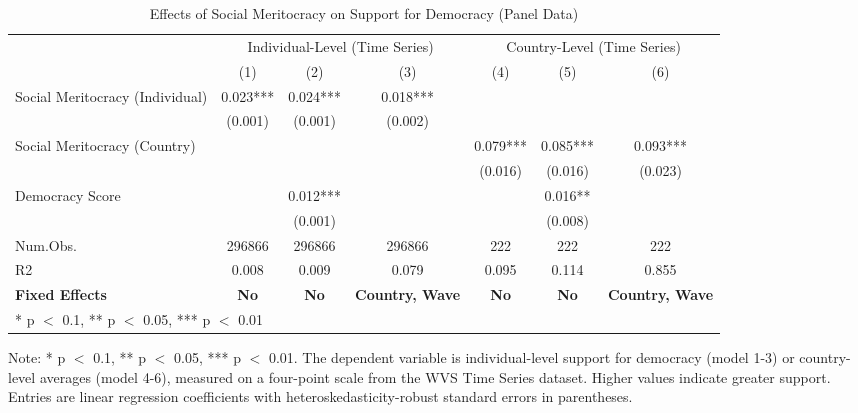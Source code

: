 \begin{table}[!h]
\centering\centering
\caption{Effects of Social Meritocracy on Support for Democracy (Panel Data)}
\centering
\begin{threeparttable}
\fontsize{7}{9}\selectfont
\begin{tabular}[t]{lcccccc}
\toprule
\multicolumn{1}{c}{ } & \multicolumn{3}{c}{Individual-Level (Time Series)} & \multicolumn{3}{c}{Country-Level (Time Series)} \\
\cmidrule(l{3pt}r{3pt}){2-4} \cmidrule(l{3pt}r{3pt}){5-7}
  &  (1) &   (2) &   (3) &   (4) &   (5) &   (6)\\
\midrule
Social Meritocracy (Individual) & 0.023*** & 0.024*** & 0.018*** &  &  & \\
 & (0.001) & (0.001) & (0.002) &  &  & \\
Social Meritocracy (Country) &  &  &  & 0.079*** & 0.085*** & 0.093***\\
 &  &  &  & (0.016) & (0.016) & (0.023)\\
Democracy Score &  & 0.012*** &  &  & 0.016** & \\
 &  & (0.001) &  &  & (0.008) & \\
Num.Obs. & 296866 & 296866 & 296866 & 222 & 222 & 222\\
R2 & 0.008 & 0.009 & 0.079 & 0.095 & 0.114 & 0.855\\
\textbf{Fixed Effects} & \textbf{No} & \textbf{No} & \textbf{Country, Wave} & \textbf{No} & \textbf{No} & \textbf{Country, Wave}\\
\bottomrule
\multicolumn{7}{l}{\rule{0pt}{1em}* p $<$ 0.1, ** p $<$ 0.05, *** p $<$ 0.01}\\
\end{tabular}
\begin{tablenotes}
\item Note: * p $<$ 0.1, ** p $<$ 0.05, *** p $<$ 0.01. The dependent variable is individual-level support for democracy (model 1-3) or country-level averages (model 4-6), measured on a four-point scale from the WVS Time Series dataset. Higher values indicate greater support. Entries are linear regression coefficients with heteroskedasticity-robust standard errors in parentheses.
\end{tablenotes}
\end{threeparttable}
\end{table}
